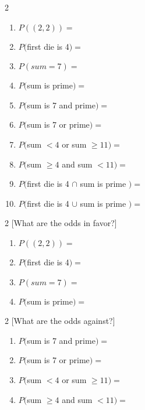 \documentclass[14pt]{extarticle}
\begin{document}
\begin{multicols}{2}
\begin{enumerate}
	\item $P((2,2))=$ \vspace{1.2cm}
	\item $P($first die is 4$)=$ \vspace{1.2cm}
	\item $P(sum=7)=$ \vspace{1.2cm}
	\item $P($sum is prime$)=$ \vspace{1.2cm}
	\item $P($sum is 7 and prime$)=$ \vfill\null\columnbreak
	\item $P($sum is 7 or prime$)=$ \vspace{1.2cm}
	\item $P($sum $< 4$ or sum $\geq 11)=$\vspace{1.2cm}
	\item $P($sum $\geq 4$ and sum $< 11)=$\vspace{1.2cm}
	\item $P($first die is 4 $\cap$ sum is prime $)=$\vspace{1.2cm}
	\item $P($first die is 4 $\cup$ sum is prime $)=$\vfill\null
\end{enumerate}
\end{multicols}
\vspace{1.2cm}
\begin{multicols}{2} [What are the odds in favor?]
	\begin{enumerate}
		\item $P((2,2))=$ \vspace{1.2cm}
		\item $P($first die is 4$)=$ \vspace{1.2cm}
		\item $P(sum=7)=$ \vspace{1.2cm}
		\item $P($sum is prime$)=$
	\end{enumerate}
\end{multicols}
\vspace{1.2cm}
\begin{multicols}{2} [What are the odds against?]
	\begin{enumerate}
		\item $P($sum is 7 and prime$)=$ \vspace{1.2cm} 
		\item $P($sum is 7 or prime$)=$ \vspace{1.2cm}
		\item $P($sum $< 4$ or sum $\geq 11)=$\vspace{1.2cm}
		\item $P($sum $\geq 4$ and sum $< 11)=$\vspace{1.2cm}
	\end{enumerate}
\end{multicols}
\vspace{1.2cm}
\end{document}

